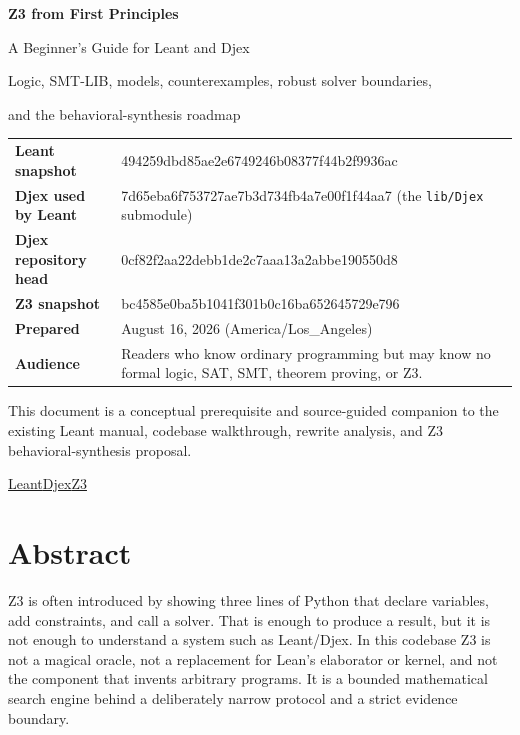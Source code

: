 \documentclass[10pt,letterpaper,oneside]{report}
\newcommand{\filepath}[1]{\nolinkurl{#1}}
\newcommand{\commitid}[1]{{\ttfamily\footnotesize #1}}
\newcommand{\RepoLeant}{\href{https://github.com/VladimirReshetnikov/Leant}{Leant}}
\newcommand{\RepoDjex}{\href{https://github.com/VladimirReshetnikov/Djex}{Djex}}
\newcommand{\RepoZthree}{\href{https://github.com/Z3Prover/z3}{Z3}}
\def\LeantCommit{494259dbd85ae2e6749246b08377f44b2f9936ac}
\def\DjexCommit{0cf82f2aa22debb1de2c7aaa13a2abbe190550d8}
\def\DjexPinnedCommit{7d65eba6f753727ae7b3d734fb4a7e00f1f44aa7}
\def\ZthreeCommit{bc4585e0ba5b1041f301b0c16ba652645729e796}
\begin{document}
\hypersetup{pageanchor=false}
\begin{titlepage}
\centering
\vspace*{0.48in}
{\Huge\bfseries\color{Ink} Z3 from First Principles\par}
\vspace{0.16in}
{\LARGE\color{Navy} A Beginner's Guide for Leant and Djex\par}
\vspace{0.20in}
{\large Logic, SMT-LIB, models, counterexamples, robust solver boundaries,\par
and the behavioral-synthesis roadmap\par}
\vspace{0.62in}
\begin{tcolorbox}[width=0.91\textwidth,colback=PaleGray,colframe=RuleGray,boxrule=0.7pt,arc=1mm]
\small
\begin{tabularx}{\textwidth}{@{}L{0.20\textwidth}Y@{}}
\textbf{Leant snapshot} & \commitid{\LeantCommit} \\
\textbf{Djex used by Leant} & \commitid{\DjexPinnedCommit} (the \filepath{lib/Djex} submodule) \\
\textbf{Djex repository head} & \commitid{\DjexCommit} \\
\textbf{Z3 snapshot} & \commitid{\ZthreeCommit} \\
\textbf{Prepared} & August 16, 2026 (America/Los\_Angeles) \\
\textbf{Audience} & Readers who know ordinary programming but may know no formal logic, SAT, SMT, theorem proving, or Z3. \\
\end{tabularx}
\end{tcolorbox}
\vfill
{\small\color{Gray}
This document is a conceptual prerequisite and source-guided companion to the existing Leant manual, codebase walkthrough, rewrite analysis, and Z3 behavioral-synthesis proposal.\par}
\vspace{0.16in}
\RepoLeant\quad\textbullet\quad\RepoDjex\quad\textbullet\quad\RepoZthree
\end{titlepage}
\clearpage
\hypersetup{pageanchor=true}

\chapter*{Abstract}

Z3 is often introduced by showing three lines of Python that declare variables, add constraints, and call a solver. That is enough to produce a result, but it is not enough to understand a system such as Leant/Djex. In this codebase Z3 is not a magical oracle, not a replacement for Lean's elaborator or kernel, and not the component that invents arbitrary programs. It is a bounded mathematical search engine behind a deliberately narrow protocol and a strict evidence boundary.
\end{document}
